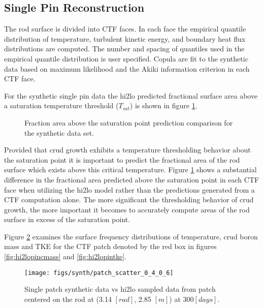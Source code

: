 \subsection{Single Pin Reconstruction}

The rod surface is divided into CTF faces.  In each face the empirical quantile distribution of temperature, turbulent kinetic energy, and boundary heat flux distributions are computed.  The number and spacing of quantiles used in the empirical quantile distribution is user specified.  Copula are fit to the synthetic data based on maximum likelihood and the Akiki information criterion in each CTF face.

For the synthetic single pin data the hi2lo predicted fractional surface area above a saturation temperature threshold ($T_{sat}$) is shown in figure \ref{fig:frac_a}.

\begin{figure}[H]%
    \centering
    \qquad
    \caption[]{Fraction area above the saturation point prediction comparison for the synthetic data set.}%
    \label{fig:frac_a}%
\end{figure}

Provided that crud growth exhibits a temperature thresholding behavior about the saturation point it is important to predict the fractional area of the rod surface which exists above this critical temperature. Figure \ref{fig:frac_a} shows a substantial difference in the fractional area predicted above the saturation point in each CTF face when utilizing the hi2lo model rather than the predictions generated from a CTF computation alone.  The more significant the thresholding behavior of crud growth, the more important it becomes to accurately compute areas of the rod surface in excess of the saturation point.


Figure \ref{fig:patchscatter} examines the surface frequency distributions of temperature, crud boron mass and TKE for the CTF patch denoted by the red box in figures \ref{fig:hi2lopincmass} and \ref{fig:hi2lopintke}.

\begin{figure}[H]
    \centering
    \texttt{[image: figs/synth/patch\_scatter\_0\_4\_0\_6]}
    \caption[Single patch synthetic CFD data vs hi2lo sampled data.]{Single patch synthetic data vs hi2lo sampled data from patch centered on the rod at (3.14 $[rad]$, 2.85 $[m]$) at 300$[days]$.}
    \label{fig:patchscatter}
\end{figure}

